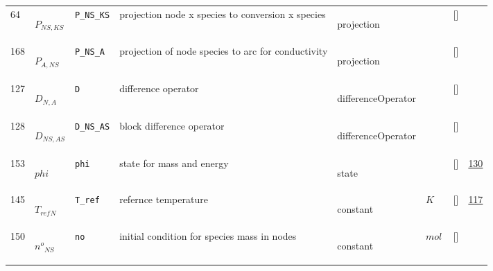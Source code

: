 \begin{longtable}{|p{1cm}|p{3cm}|p{3cm}|p{7cm}|p{3.0cm}|p{3cm}|p{2cm}|p{1cm}|}
    64
             & \hypertarget{"v:64"}{ $ {P}{_{{N S}, {K S}}} $}
             & \verb|P_NS_KS|
             & projection node x species to conversion x species
             & \begin{lay}projection \end{lay}
             & $  $
             & []
             & \\
    168
             & \hypertarget{"v:168"}{ $ {P}{_{A, {N S}}} $}
             & \verb|P_NS_A|
             & projection of node species to arc for conductivity
             & \begin{lay}projection \end{lay}
             & $  $
             & []
             & \\
    127
             & \hypertarget{"v:127"}{ $ {D}{_{N, A}} $}
             & \verb|D|
             & difference operator
             & \begin{lay}differenceOperator \end{lay}
             & $  $
             & []
             & \\
    128
             & \hypertarget{"v:128"}{ $ {D}{_{{N S}, {A S}}} $}
             & \verb|D_NS_AS|
             & block difference operator
             & \begin{lay}differenceOperator \end{lay}
             & $  $
             & []
             & \\
    153
             & \hypertarget{"v:153"}{ $ {phi}{_{}} $}
             & \verb|phi|
             & state for mass and energy
             & \begin{lay}state \end{lay}
             & $  $
             & []
             & \hyperlink{"e:130"}{ 130 }
                 \\
    145
             & \hypertarget{"v:145"}{ $ {T_{ref}}{_{N}} $}
             & \verb|T_ref|
             & refernce temperature
             & \begin{lay}constant \end{lay}
             & $ K \, $
             & []
             & \hyperlink{"e:117"}{ 117 }
                 \\
    150
             & \hypertarget{"v:150"}{ $ {{n^o}}{_{{N S}}} $}
             & \verb|no|
             & initial condition for species mass in nodes
             & \begin{lay}constant \end{lay}
             & $ mol \, $
             & []

\end{longtable}

